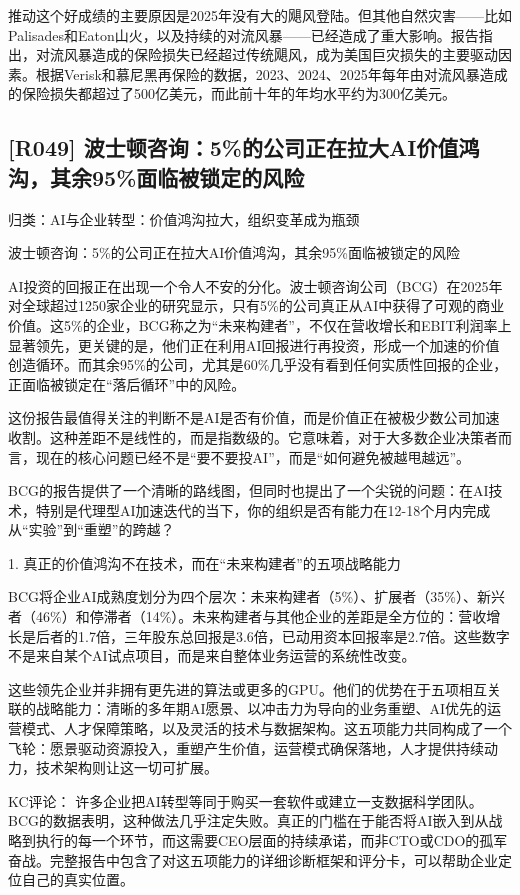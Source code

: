 \documentclass[11pt]{ctexart}
\begin{document}
推动这个好成绩的主要原因是2025年没有大的飓风登陆。但其他自然灾害——比如Palisades和Eaton山火，以及持续的对流风暴——已经造成了重大影响。报告指出，对流风暴造成的保险损失已经超过传统飓风，成为美国巨灾损失的主要驱动因素。根据Verisk和慕尼黑再保险的数据，2023、2024、2025年每年由对流风暴造成的保险损失都超过了500亿美元，而此前十年的年均水平约为300亿美元。

\subsection{[R049] 波士顿咨询：5\%的公司正在拉大AI价值鸿沟，其余95\%面临被锁定的风险}
{\small\color{refgray}归类：AI与企业转型：价值鸿沟拉大，组织变革成为瓶颈}

波士顿咨询：5\%的公司正在拉大AI价值鸿沟，其余95\%面临被锁定的风险

AI投资的回报正在出现一个令人不安的分化。波士顿咨询公司（BCG）在2025年对全球超过1250家企业的研究显示，只有5\%的公司真正从AI中获得了可观的商业价值。这5\%的企业，BCG称之为“未来构建者”，不仅在营收增长和EBIT利润率上显著领先，更关键的是，他们正在利用AI回报进行再投资，形成一个加速的价值创造循环。而其余95\%的公司，尤其是60\%几乎没有看到任何实质性回报的企业，正面临被锁定在“落后循环”中的风险。

这份报告最值得关注的判断不是AI是否有价值，而是价值正在被极少数公司加速收割。这种差距不是线性的，而是指数级的。它意味着，对于大多数企业决策者而言，现在的核心问题已经不是“要不要投AI”，而是“如何避免被越甩越远”。

BCG的报告提供了一个清晰的路线图，但同时也提出了一个尖锐的问题：在AI技术，特别是代理型AI加速迭代的当下，你的组织是否有能力在12-18个月内完成从“实验”到“重塑”的跨越？

1. 真正的价值鸿沟不在技术，而在“未来构建者”的五项战略能力

BCG将企业AI成熟度划分为四个层次：未来构建者（5\%）、扩展者（35\%）、新兴者（46\%）和停滞者（14\%）。未来构建者与其他企业的差距是全方位的：营收增长是后者的1.7倍，三年股东总回报是3.6倍，已动用资本回报率是2.7倍。这些数字不是来自某个AI试点项目，而是来自整体业务运营的系统性改变。

这些领先企业并非拥有更先进的算法或更多的GPU。他们的优势在于五项相互关联的战略能力：清晰的多年期AI愿景、以冲击力为导向的业务重塑、AI优先的运营模式、人才保障策略，以及灵活的技术与数据架构。这五项能力共同构成了一个飞轮：愿景驱动资源投入，重塑产生价值，运营模式确保落地，人才提供持续动力，技术架构则让这一切可扩展。

KC评论： 许多企业把AI转型等同于购买一套软件或建立一支数据科学团队。BCG的数据表明，这种做法几乎注定失败。真正的门槛在于能否将AI嵌入到从战略到执行的每一个环节，而这需要CEO层面的持续承诺，而非CTO或CDO的孤军奋战。完整报告中包含了对这五项能力的详细诊断框架和评分卡，可以帮助企业定位自己的真实位置。
\end{document}
